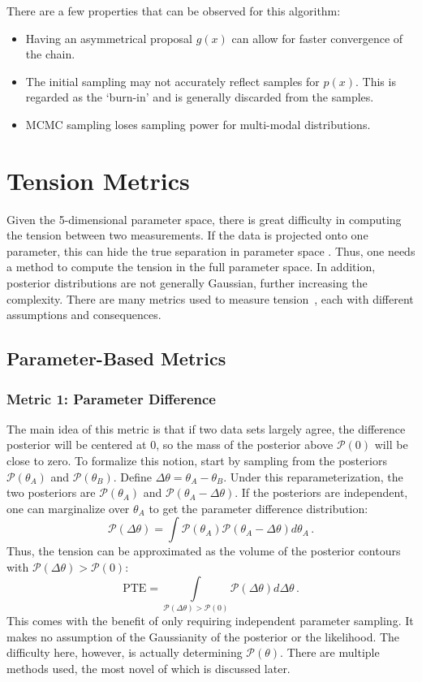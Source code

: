 There are a few properties that can be observed for this algorithm:
\begin{itemize}
    \item Having an asymmetrical proposal $g(x)$ can allow for faster convergence of the chain.
    \item The initial sampling may not accurately reflect samples for $p(x)$. 
    This is regarded as the `burn-in' and is generally discarded from the samples.
    \item MCMC sampling loses sampling power for multi-modal distributions. 
\end{itemize}

\section{Tension Metrics}\label{sec:tension_metrics}
Given the 5-dimensional parameter space, there is great difficulty in computing the tension between two measurements. If the data is projected onto one parameter, this can hide the true separation in parameter space 
. Thus, one needs a method to compute the tension in the full parameter space. In addition, posterior distributions are not generally Gaussian, further increasing the complexity. There are many metrics used to measure tension~\cite{lemos_assessing_2021,seehars_quantifying_2016}, each with different assumptions and consequences.
\subsection{Parameter-Based Metrics}
\subsubsection{Metric 1: Parameter Difference}
The main idea of this metric is that if two data sets largely agree, the difference posterior will be centered at 0, so the mass of the posterior above $\mathcal{P}(0)$ will be close to zero. To formalize this notion, start by sampling from the posteriors $\mathcal{P}(\theta_A)$ and $\mathcal{P}(\theta_B)$.
Define $\Delta\theta = \theta_A - \theta_B$. Under this reparameterization, the two posteriors are $\mathcal{P}(\theta_A)$ and $\mathcal{P}(\theta_A-\Delta\theta)$. If the posteriors are independent, one can marginalize over $\theta_A$ to get the parameter difference distribution:
\begin{equation}
    \mathcal{P}(\Delta\theta) = \int \mathcal{P}(\theta_A)\mathcal{P}(\theta_A - \Delta\theta) d\theta_A\,.
\end{equation}
Thus, the tension can be approximated as the volume of the posterior contours with $\mathcal{P}(\Delta\theta)>\mathcal{P}(0)$:
\begin{equation}
    \mathrm{PTE} = \int\limits_{\mathcal{P}(\Delta\theta)>\mathcal{P}(0)}\mathcal{P}(\Delta\theta) d\Delta\theta\,.
\end{equation}
This comes with the benefit of only requiring independent parameter sampling. It makes no assumption of the Gaussianity of the posterior or the likelihood. The difficulty here, however, is actually determining $\mathcal{P}(\theta)$. There are multiple methods used, the most novel of which is discussed later.

